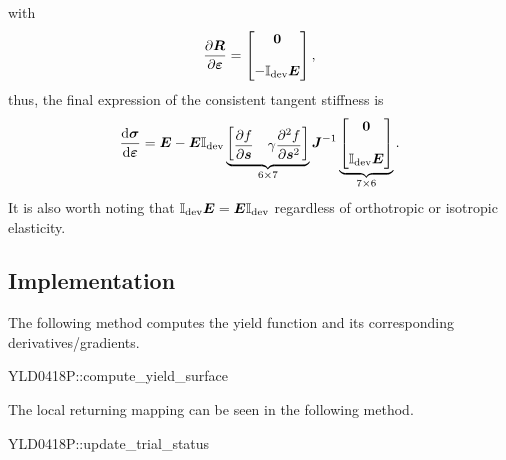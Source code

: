     with
    \begin{gather}
        \dfrac{\partial{\bm{R}}}{\partial{\bm{\varepsilon}}}=\begin{bmatrix}
            \bm{0} \\[4mm]
            -\mathbb{I}_\text{dev}\bm{E}
        \end{bmatrix},
    \end{gather}
    thus, the final expression of the consistent tangent stiffness is
    \begin{gather}
    \dfrac{\mathrm{d}\bm{\sigma}}{\mathrm{d}\bm{\varepsilon}}=\bm{E}-\bm{E}\mathbb{I}_\text{dev}\underbrace{\begin{bmatrix}
            \dfrac{\partial{f}}{\partial{\bm{s}}} & \gamma\dfrac{\partial{^2f}}{\partial{\bm{s}^2}}
        \end{bmatrix}}_{6\times7}\bm{J}^{-1}\underbrace{\begin{bmatrix}
            \bm{0} \\[4mm]
            \mathbb{I}_\text{dev}\bm{E}
        \end{bmatrix}}_{7\times6}.
\end{gather}
It is also worth noting that $\mathbb{I}_\text{dev}\bm{E}=\bm{E}\mathbb{I}_\text{dev}$ regardless of orthotropic or isotropic elasticity.
\subsection{Implementation}
The following method computes the yield function and its corresponding derivatives/gradients.
\begin{cppcode}
YLD0418P::compute_yield_surface
\end{cppcode}

The local returning mapping can be seen in the following method.
\begin{cppcode}
YLD0418P::update_trial_status
\end{cppcode}
